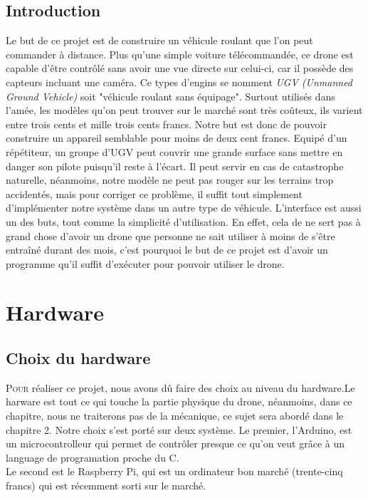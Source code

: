 \documentclass[a4paper,11pt]{report}
\begin{document}
{\section*{Introduction}
Le but de ce projet est de construire un véhicule roulant que l'on peut commander à distance. Plus qu'une simple voiture télécommandée, ce drone est capable d'être contrôlé sans avoir une vue directe sur celui-ci, car il possède des capteurs incluant une caméra. Ce types d'engins se nomment \textit{UGV (Unmanned Ground Vehicle)} soit "véhicule roulant sans équipage". Surtout utilisés dans l'amée, les modèles qu'on peut trouver sur le marché sont très coûteux, ils varient entre trois cents et mille trois cents francs. Notre but est donc de pouvoir construire un appareil semblable pour moins de deux cent francs. Equipé d'un répétiteur, un groupe d'UGV peut couvrir une grande surface sans mettre en danger son pilote puisqu'il reste à l'écart. Il peut servir en cas de catastrophe naturelle, néanmoins, notre modèle ne peut pas rouger sur les terrains trop accidentés, mais pour corriger ce problème, il suffit tout simplement d'implémenter notre système dans un autre type de véhicule. L'interface est aussi un des buts, tout comme la simplicité d'utilisation. En effet, cela de ne sert pas à grand chose d'avoir un drone que personne ne sait utiliser à moins de s'être entraîné durant des mois, c'est pourquoi le but de ce projet est d'avoir un programme qu'il suffit d'exécuter pour pouvoir utiliser le drone. 
\clearpage


\chapter{Hardware}

\section{Choix du hardware}
\lettrine{P}{our} réaliser ce projet, nous avons dû faire des choix au niveau du hardware.Le harware est tout ce qui touche la partie physique du drone, néanmoins, dans ce chapitre, nous ne traiterons pas de la mécanique, ce sujet sera abordé dans le chapitre 2. Notre choix s'est porté sur deux système. Le premier, l'Arduino, est un microcontrolleur qui permet de contrôler presque ce qu'on veut grâce à un language de programation proche du C.\\
Le second est le Raspberry Pi, qui est un ordinateur bon marché (trente-cinq francs) qui est récemment sorti sur le marché. 


}
\end{document}
